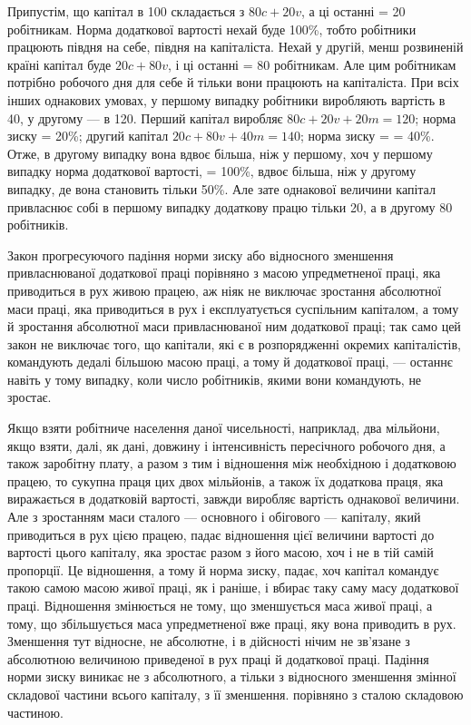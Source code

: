 Припустім, що капітал в 100 складається з $80c + 20v$, а ці
останні = 20 робітникам. Норма додаткової вартості нехай буде
100\%, тобто робітники працюють півдня на себе, півдня на капіталіста.
Нехай у другій, менш розвиненій країні капітал буде
$20c + 80v$, і ці останні = 80 робітникам. Але цим робітникам потрібно
 робочого дня для себе й тільки  вони працюють на
капіталіста. При всіх інших однакових умовах, у першому випадку
робітники виробляють вартість в 40, у другому — в 120.
Перший капітал виробляє $80c + 20v + 20m = 120$; норма зиску =
20\%; другий капітал $20c + 80v + 40m = 140$; норма зиску =
= 40\%. Отже, в другому випадку вона вдвоє більша, ніж у першому,
хоч у першому випадку норма додаткової вартості, = 100\%,
вдвоє більша, ніж у другому випадку, де вона становить тільки
50\%. Але зате однакової величини капітал привласнює собі в першому
випадку додаткову працю тільки 20, а в другому 80 робітників.

Закон прогресуючого падіння норми зиску або відносного
зменшення привласнюваної додаткової праці порівняно з масою
упредметненої праці, яка приводиться в рух живою працею, аж
ніяк не виключає зростання абсолютної маси праці, яка приводиться
в рух і експлуатується суспільним капіталом, а тому й зростання
абсолютної маси привласнюваної ним додаткової праці; так само
цей закон не виключає того, що капітали, які є в розпорядженні
окремих капіталістів, командують дедалі більшою масою праці,
а тому й додаткової праці, — останнє навіть у тому випадку,
коли число робітників, якими вони командують, не зростає.

Якщо взяти робітниче населення даної чисельності, наприклад,
два мільйони, якщо взяти, далі, як дані, довжину і інтенсивність
пересічного робочого дня, а також заробітну плату,
а разом з тим і відношення між необхідною і додатковою працею,
то сукупна праця цих двох мільйонів, а також їх додаткова
праця, яка виражається в додатковій вартості, завжди виробляє
вартість однакової величини. Але з зростанням маси сталого
— основного і обігового — капіталу, який приводиться в рух
цією працею, падає відношення цієї величини вартості до вартості
цього капіталу, яка зростає разом з його масою, хоч і не в тій
самій пропорції. Це відношення, а тому й норма зиску, падає, хоч
капітал командує такою самою масою живої праці, як і раніше,
і вбирає таку саму масу додаткової праці. Відношення змінюється
не тому, що зменшується маса живої праці, а тому, що збільшується
маса упредметненої вже праці, яку вона приводить в рух.
Зменшення тут відносне, не абсолютне, і в дійсності нічим
не зв’язане з абсолютною величиною приведеної в рух праці
й додаткової праці. Падіння норми зиску виникає не з абсолютного,
а тільки з відносного зменшення змінної складової частини
всього капіталу, з її зменшення. порівняно з сталою складовою
частиною.

